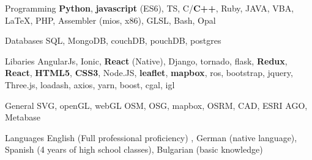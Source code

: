 

\begin{cvskills}

  \cvskill
    {Programming} %
    {\textbf{Python}, \textbf{javascript} (ES6), TS, C/\textbf{C++}, Ruby, JAVA, VBA, LaTeX, PHP, Assembler (mios, x86), GLSL, Bash, Opal} %

  \cvskill
    {Databases} %
    {SQL, MongoDB, couchDB, pouchDB, postgres} %

  \cvskill
    {Libaries} %
    {AngularJs, Ionic, \textbf{React} (Native), Django, tornado, flask, \textbf{Redux}, \textbf{React}, \textbf{HTML5}, \textbf{CSS3}, Node.JS, \textbf{leaflet}, \textbf{mapbox}, ros, bootstrap, jquery, Three.js, loadash, axios, yarn, boost, cgal, igl} %


  \cvskill
    {General} %
    {SVG, openGL, webGL OSM, OSG, mapbox, OSRM, CAD, ESRI AGO, Metabase} %

  \cvskill
    {Languages} %
    {English (Full professional proficiency) , German (native language), Spanish (4 years of high school classes), Bulgarian (basic knowledge)} %

\end{cvskills}
